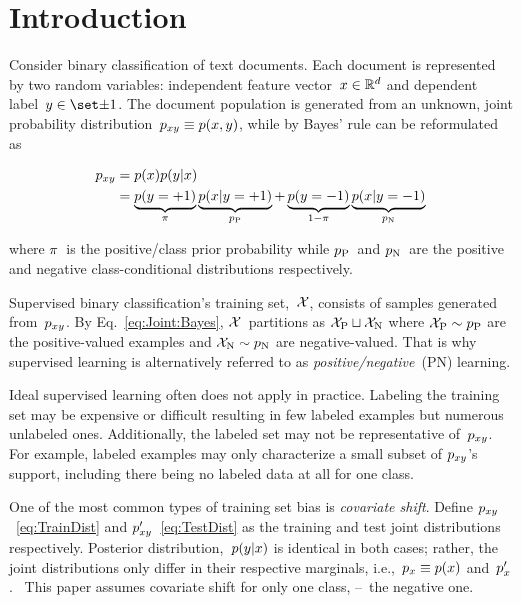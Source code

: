 \documentclass[]{subfiles}
\begin{document}
\section{Introduction}\label{sec:Introduction}

Consider binary classification of text documents.  Each document is represented by two random variables: independent feature vector~${x \in \mathbb{R}^{d}}$ and dependent label~${\y \in \domainY}$. The document population is generated from an unknown, joint probability distribution~${p_{xy} \equiv p(x,y)}$, while by Bayes' rule can be reformulated as

\begin{align}
    p_{xy} &= p(x) p(y \vert x) \label{eq:TrainDist} \\
           &= \underbrace{p(y = {+}1)}_{\pi} \underbrace{p(x \vert y = {+}1)}_{p_{\textnormal{P}}} + \underbrace{p(y = {-}1)}_{1-\pi} \underbrace{p(x \vert y = {-}1)}_{p_{\textnormal{N}}} \label{eq:Joint:Bayes}
\end{align}

\noindent
where $\pi$~is the positive\-/class prior probability while $p_{\textnormal{P}}$~and $p_{\textnormal{N}}$~are the positive and negative class-conditional distributions respectively.

Supervised binary classification's training set,~$\mathcal{X}$, consists of samples generated from~$p_{xy}$. By Eq.~\eqref{eq:Joint:Bayes}, $\mathcal{X}$~partitions as ${\mathcal{X}_{\textnormal{P}} \sqcup \mathcal{X}_{\textnormal{N}}}$ where ${\mathcal{X}_{\textnormal{P}} \sim p_{\textnormal{P}}}$ are the positive-valued examples and ${\mathcal{X}_{\textnormal{N}} \sim p_{\textnormal{N}}}$ are negative-valued.  That is why supervised learning is alternatively referred to as \textit{positive\-/negative}~(PN) learning.

Ideal supervised learning often does not apply in practice.  Labeling the training set may be expensive or difficult resulting in few labeled examples but numerous unlabeled ones.  Additionally, the labeled set may not be representative of~$p_{xy}$.  For example, labeled examples may only characterize a small subset of $p_{xy}$'s support, including there being no labeled data at all for one class.

One of the most common types of training set bias is \textit{covariate shift}. Define $p_{xy}$~\eqref{eq:TrainDist} and ${p_{xy}'}$~\eqref{eq:TestDist} as the training and test joint distributions respectively.  Posterior distribution,~${p(y \vert x)}$ is identical in both cases; rather, the joint distributions only differ in their respective marginals, i.e.,~${p_{x} \equiv p(x)}$ and~$p_{x}'$.~\cite{Huang:2006}  This paper assumes covariate shift for only one class, --~the negative one.
\end{document}
